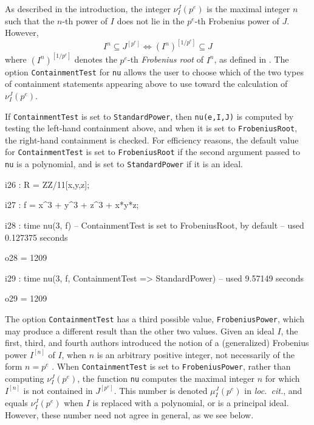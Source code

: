 \documentclass{amsart}
\begin{document}

As described in the introduction, the integer $\nu_I^J(p^e)$ is the maximal integer $n$ such that the $n$-th power of $I$ does not lie in the $p^e$-th Frobenius power of $J$.  However,
\begin{equation*}
  I^n \subseteq J^{[p^e]} \Longleftrightarrow (I^n)^{[1/p^e]} \subseteq J
\end{equation*}
where $(I^n)^{[1/p^e]}$ denotes the $p^e$-th \emph{Frobenius root} of $I^n$, as defined in \cite{BlickleMustataSmithDiscretenessAndRationalityOfFThresholds}.
The option \texttt{ContainmentTest} for \texttt{nu} allows the user to choose which of the two types of containment statements appearing above to use toward the calculation of $\nu_I^J(p^e)$.

If \texttt{ContainmentTest} is set to \texttt{StandardPower}, then \texttt{nu(e,I,J)} is computed by testing the left-hand containment above, and when it is set to \texttt{FrobeniusRoot}, the right-hand containment is checked.
For efficiency reasons, the default value for \texttt{ContainmentTest} is set to  \texttt{FrobeniusRoot} if the second argument passed to \texttt{nu} is a polynomial, and is set to \texttt{StandardPower} if it is an ideal.

\bigskip
{\small
{}
\begin{MyVerbatim}
i26 : R = ZZ/11[x,y,z];

i27 : f = x^3 + y^3 + z^3 + x*y*z;

i28 : time nu(3, f) -- ContainmentTest is set to FrobeniusRoot, by default
     -- used 0.127375 seconds

o28 = 1209

i29 : time nu(3, f, ContainmentTest => StandardPower)
     -- used 9.57149 seconds

o29 = 1209
\end{MyVerbatim}
}
\bigskip


The option \texttt{ContainmentTest} has a third possible value, \texttt{FrobeniusPower}, which may produce a different result than the other two values.
Given an ideal $I$, the first, third, and fourth authors introduced the notion of a (generalized) Frobenius power $I^{[n]}$ of $I$, when $n$ is an arbitrary positive integer, not necessarily of the form $n = p^e$ \cite{hernandez+etal.frobenius_powers}.
When \texttt{ContainmentTest} is set to \texttt{FrobeniusPower}, rather than  computing $\nu_I^J(p^e)$, the function \texttt{nu} computes the maximal integer $n$ for which $I^{[n]}$ is not contained in $J^{[p^e]}$.  This number is denoted $\mu_I^J(p^e)$ in \emph{loc.\ cit.}, and equals $\nu_I^J(p^e)$ when $I$ is replaced with a polynomial, or is a principal ideal.  However, these number need not agree in general, as we see below.
\end{document}
